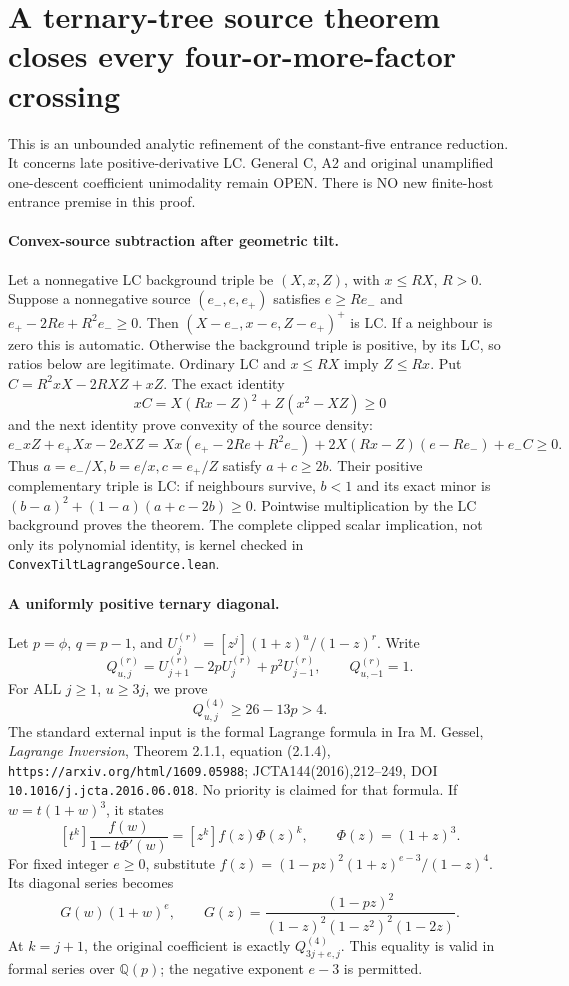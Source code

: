 \section{A ternary-tree source theorem closes every four-or-more-factor crossing}
This is an unbounded analytic refinement of the constant-five entrance
reduction. It concerns late positive-derivative LC. General C, A2 and
original unamplified one-descent coefficient unimodality remain OPEN.
There is NO new finite-host entrance premise in this proof.

\paragraph{Convex-source subtraction after geometric tilt.}
Let a nonnegative LC background triple be $(X,x,Z)$, with
$x\le RX$, $R>0$. Suppose a nonnegative source $(e_-,e,e_+)$
satisfies $e\ge Re_-$ and
$e_+-2Re+R^2e_-\ge0$. Then $(X-e_-,x-e,Z-e_+)^+$ is LC.
If a neighbour is zero this is automatic. Otherwise the background
triple is positive, by its LC, so ratios below are legitimate.
Ordinary LC and $x\le RX$ imply $Z\le Rx$. Put
$C=R^2xX-2RXZ+xZ$. The exact identity
\[
 xC=X(Rx-Z)^2+Z(x^2-XZ)\ge0
\]
and the next identity prove convexity of the source density:
\[
 e_-xZ+e_+Xx-2eXZ
  =Xx(e_+-2Re+R^2e_-)+2X(Rx-Z)(e-Re_-)+e_-C\ge0.
\]
Thus $a=e_-/X,b=e/x,c=e_+/Z$ satisfy $a+c\ge2b$.
Their positive complementary triple is LC: if neighbours survive,
$b<1$ and its exact minor is
$(b-a)^2+(1-a)(a+c-2b)\ge0$.
Pointwise multiplication by the LC background proves the theorem.
The complete clipped scalar implication, not only its polynomial
identity, is kernel checked in \texttt{ConvexTiltLagrangeSource.lean}.

\paragraph{A uniformly positive ternary diagonal.}
Let $p=\phi$, $q=p-1$, and
$U^{(r)}_j=[z^j](1+z)^u/(1-z)^r$. Write
\[
 Q^{(r)}_{u,j}=U^{(r)}_{j+1}-2pU^{(r)}_j+p^2U^{(r)}_{j-1},
 \qquad Q^{(r)}_{u,-1}=1.
\]
For ALL $j\ge1$, $u\ge3j$, we prove
\[
                  Q^{(4)}_{u,j}\ge26-13p>4.          \tag{1}
\]
The standard external input is the formal Lagrange formula in
Ira M. Gessel, \emph{Lagrange Inversion}, Theorem 2.1.1,
equation (2.1.4),
\texttt{https://arxiv.org/html/1609.05988}; JCTA144(2016),212--249,
DOI \texttt{10.1016/j.jcta.2016.06.018}. No priority is claimed
for that formula. If $w=t(1+w)^3$, it states
\[
 [t^k]\frac{f(w)}{1-t\Phi'(w)}=[z^k]f(z)\Phi(z)^k,
                         \qquad\Phi(z)=(1+z)^3.
\]
For fixed integer $e\ge0$, substitute
$f(z)=(1-pz)^2(1+z)^{e-3}/(1-z)^4$.
Its diagonal series becomes
\[
 G(w)(1+w)^e,\qquad
 G(z)=\frac{(1-pz)^2}{(1-z)^2(1-z^2)^2(1-2z)}.
\]
At $k=j+1$, the original coefficient is exactly
$Q^{(4)}_{3j+e,j}$. This equality is valid in formal series
over $\mathbb Q(p)$; the negative exponent $e-3$ is permitted.

